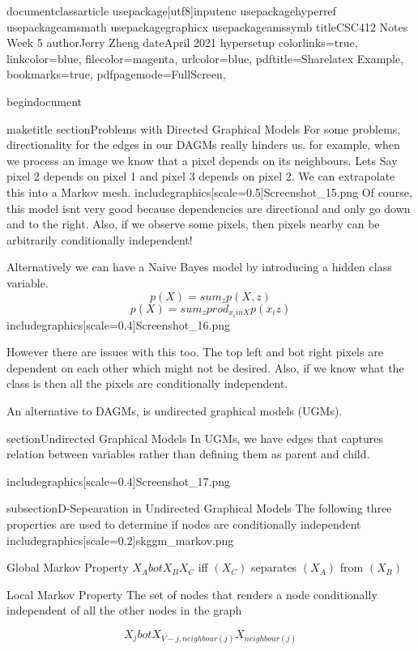 documentclass{article}
usepackage[utf8]{inputenc}
usepackage{hyperref}
usepackage{amsmath}
usepackage{graphicx}
usepackage{amssymb}
title{CSC412 Notes Week 5}
author{Jerry Zheng}
date{April 2021}
hypersetup{
    colorlinks=true,
    linkcolor=blue,
    filecolor=magenta,      
    urlcolor=blue,
    pdftitle={Sharelatex Example},
    bookmarks=true,
    pdfpagemode=FullScreen,
}

begin{document}

maketitle
section{Problems with Directed Graphical Models}
For some problems, directionality for the edges in our DAGMs really hinders us.
for example,  when we process an image we know that a pixel depends on its neighbours.
Lets Say pixel 2 depends on pixel 1 and pixel 3 depends on pixel 2.
We can extrapolate this into a Markov mesh.
includegraphics[scale=0.5]{Screenshot_15.png}
Of course, this model isnt very good because dependencies are directional and only go down and to the right.
Also, if we observe some pixels, then pixels nearby can be arbitrarily conditionally independent!

Alternatively we can have a Naive Bayes model by introducing a hidden class variable.
$$p(X) = sum_z p(X,z)$$
$$p(X) = sum_z prod_{x_iin X} p(x_iz)$$
includegraphics[scale=0.4]{Screenshot_16.png}

However there are issues with this too.
The top left and bot right pixels are dependent on each other which might not be desired.
Also, if we know what the class is then all the pixels are conditionally independent.

An alternative to DAGMs, is undirected graphical models (UGMs).


section{Undirected Graphical Models}
In UGMs, we have edges that captures relation between variables rather than defining them as parent and child.

includegraphics[scale=0.4]{Screenshot_17.png}

subsection{D-Sepearation in Undirected Graphical Models}
The following three properties are used to determine if nodes are conditionally independent
includegraphics[scale=0.2]{skggm_markov.png}

Global Markov Property 
$X_A bot X_B  X_C$ iff $(X_C)$ separates $(X_A)$ from $(X_B)$

Local Markov Property The set of nodes that renders a node conditionally independent of all the other nodes in the graph

$$X_j bot X_{V - {j,neighbour(j)}} X_{neighbour(j)}$$

